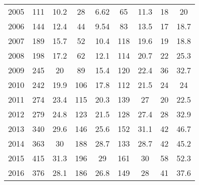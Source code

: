 \begin{table}[htbp]
\begin{tabular}{l*{8}{c}}
2005      &      111&     10.2&       28&     6.62&       65&     11.3&       18&       20\\
2006      &      144&     12.4&       44&     9.54&       83&     13.5&       17&     18.7\\
2007      &      189&     15.7&       52&     10.4&      118&     19.6&       19&     18.8\\
2008      &      198&     17.2&       62&     12.1&      114&     20.7&       22&     25.3\\
2009      &      245&       20&       89&     15.4&      120&     22.4&       36&     32.7\\
2010      &      242&     19.9&      106&     17.8&      112&     21.5&       24&       24\\
2011      &      274&     23.4&      115&     20.3&      139&       27&       20&     22.5\\
2012      &      279&     24.8&      123&     21.5&      128&     27.4&       28&     32.9\\
2013      &      340&     29.6&      146&     25.6&      152&     31.1&       42&     46.7\\
2014      &      363&       30&      188&     28.7&      133&     28.7&       42&     45.2\\
2015      &      415&     31.3&      196&       29&      161&       30&       58&     52.3\\
2016      &      376&     28.1&      186&     26.8&      149&       28&       41&     37.6\\
\hline\hline
\end{tabular}
\end{table}
